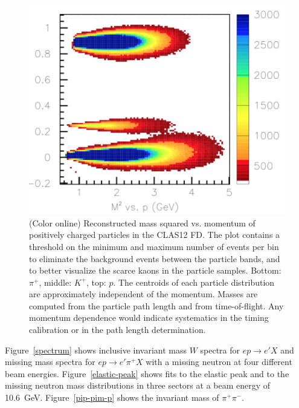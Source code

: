 \documentclass[final,3p,twocolumn]{elsarticle}
\begin{document}
\begin{figure}[hp!]
\centerline{\includegraphics[width=1.0\columnwidth]{FTOF1b_M2-vs-p.png}}
\caption{(Color online) Reconstructed mass squared vs. momentum of positively charged particles in the CLAS12 FD. The plot
  contains a threshold on the minimum and maximum number of events per bin to eliminate the background events 
  between the particle bands, and to better visualize the scarce kaons in the particle samples. Bottom: $\pi^+$, middle: $K^+$, top: $p$. 
  The centroids of each particle distribution are approximately independent of the
  momentum. Masses are computed from the particle path length and from time-of-flight. Any momentum
  dependence would indicate systematics in the timing calibration or in the path length determination.}
\label{mass2-mom}
\end{figure} 


Figure~\ref{spectrum} shows inclusive invariant mass $W$ spectra for $ep \to e' X$ and missing mass spectra
for $ep \to e' \pi^+ X$ with a missing neutron at four different beam energies. Figure~\ref{elastic-peak} shows
fits to the elastic peak and to the missing neutron mass distributions in three sectors at a beam energy of 10.6~GeV.
Figure~\ref{pip-pim-p} shows the invariant mass of $\pi^+\pi^-$.
\end{document}
